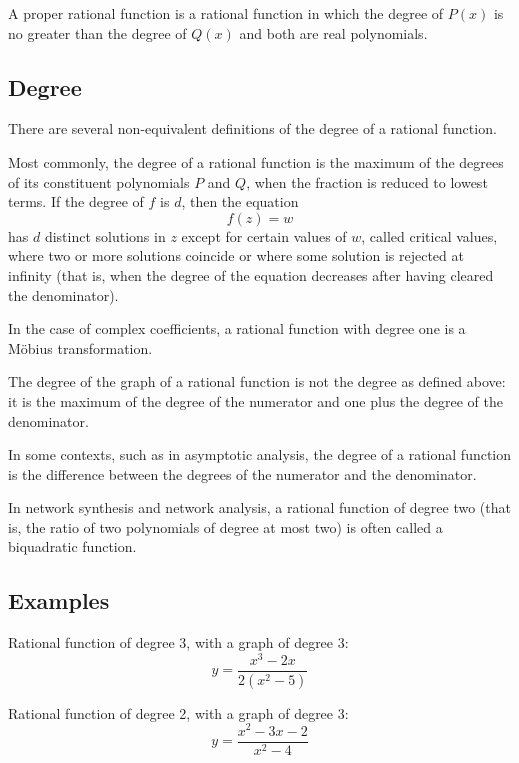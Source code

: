 A proper rational function is a rational function in which the degree of $P(x)$ is no greater than the degree of $Q(x)$ and both are real polynomials.

\subsection{Degree}
\label{sss:degr-fb81}

There are several non-equivalent definitions of the degree of a rational function.

Most commonly, the degree of a rational function is the maximum of the degrees of its constituent polynomials $P$ and $Q$, when the fraction is reduced to lowest terms. If the degree of $f$ is $d$, then the equation
\[
f(z) = w
\]
has $d$ distinct solutions in $z$ except for certain values of $w$, called critical values, where two or more solutions coincide or where some solution is rejected at infinity (that is, when the degree of the equation decreases after having cleared the denominator).

In the case of complex coefficients, a rational function with degree one is a Möbius
transformation.

The degree of the graph of a rational function is not the degree as defined above: it is
the maximum of the degree of the numerator and one plus the degree of the denominator.

In some contexts, such as in asymptotic analysis, the degree of a rational function is the
difference between the degrees of the numerator and the denominator.

In network synthesis and network analysis, a rational function of degree two (that is, the
ratio of two polynomials of degree at most two) is often called a biquadratic function.

\subsection{Examples}
\label{sss:exam-bfeb}

Rational function of degree 3, with a graph of degree 3:
\[
y = \frac{x^3 - 2x}{2(x^2 - 5)}
\]

Rational function of degree 2, with a graph of degree 3:
\[
y = \frac{x^2 - 3x - 2}{x^2 - 4}
\]

